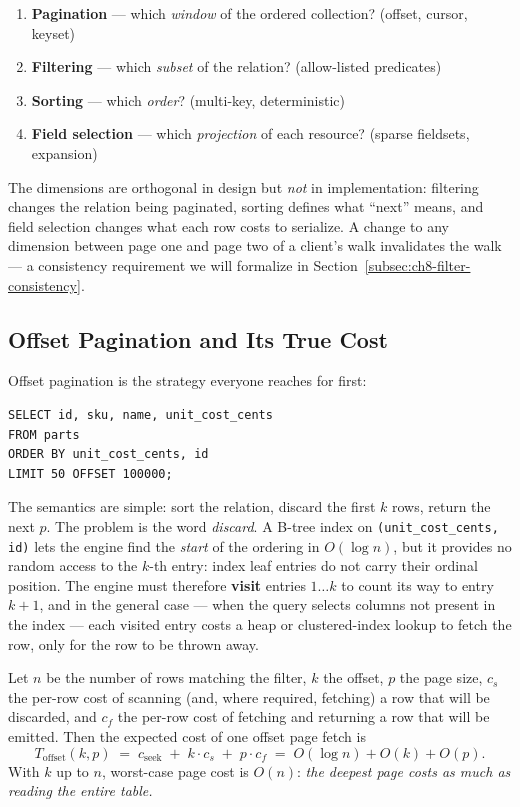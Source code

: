 \begin{enumerate}
  \item \textbf{Pagination} --- which \emph{window} of the ordered
        collection? (offset, cursor, keyset)
  \item \textbf{Filtering} --- which \emph{subset} of the relation?
        (allow-listed predicates)
  \item \textbf{Sorting} --- which \emph{order}? (multi-key, deterministic)
  \item \textbf{Field selection} --- which \emph{projection} of each
        resource? (sparse fieldsets, expansion)
\end{enumerate}

The dimensions are orthogonal in design but \emph{not} in implementation:
filtering changes the relation being paginated, sorting defines what
``next'' means, and field selection changes what each row costs to
serialize. A change to any dimension between page one and page two of a
client's walk invalidates the walk --- a consistency requirement we will
formalize in Section~\ref{subsec:ch8-filter-consistency}.

\subsection{Offset Pagination and Its True Cost}
\label{subsec:ch8-offset-cost}

Offset pagination is the strategy everyone reaches for first:

\begin{verbatim}
SELECT id, sku, name, unit_cost_cents
FROM parts
ORDER BY unit_cost_cents, id
LIMIT 50 OFFSET 100000;
\end{verbatim}

The semantics are simple: sort the relation, discard the first $k$ rows,
return the next $p$. The problem is the word \emph{discard}. A B-tree index
on \texttt{(unit\_cost\_cents, id)} lets the engine find the \emph{start} of
the ordering in $O(\log n)$, but it provides no random access to the
$k$-th entry: index leaf entries do not carry their ordinal position. The
engine must therefore \textbf{visit} entries $1 \ldots k$ to count its way to
entry $k{+}1$, and in the general case --- when the query selects columns
not present in the index --- each visited entry costs a heap or clustered-index
lookup to fetch the row, only for the row to be thrown away.

\begin{definition}
Let $n$ be the number of rows matching the filter, $k$ the offset, $p$ the
page size, $c_s$ the per-row cost of scanning (and, where required, fetching)
a row that will be discarded, and $c_f$ the per-row cost of fetching and
returning a row that will be emitted. Then the expected cost of one offset
page fetch is
\[
T_{\mathrm{offset}}(k, p) \;=\; c_{\mathrm{seek}} \;+\; k \cdot c_s \;+\; p \cdot c_f
\;=\; O(\log n) + O(k) + O(p).
\]
With $k$ up to $n$, worst-case page cost is $O(n)$: \emph{the deepest page
costs as much as reading the entire table.}
\end{definition}

